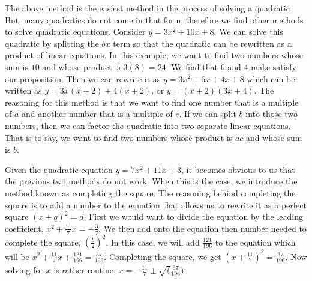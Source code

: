 \documentclass[12pt]{report}
\begin{document}
The above method is the easiest method in the process of solving a quadratic. But, many quadratics do not come in that form, therefore we find other methods to solve quadratic equations. Consider $y=3x^2+10x+8$. We can solve this quadratic by splitting the $bx$ term so that the quadratic can be rewritten as a product of linear equations. In this example, we want to find two numbers whose sum is $10$ and whose product is $3(8)=24$. We find that $6$ and $4$ make satisfy our proposition. Then we can rewrite it as $y=3x^2+6x+4x+8$ which can be written as $y=3x(x+2)+4(x+2)$, or $y=(x+2)(3x+4)$. The reasoning for this method is that we want to find one number that is a multiple of $a$ and another number that is a multiple of $c$. If we can split $b$ into those two numbers, then we can factor the quadratic into two separate linear equations. That is to say, we want to find two numbers whose product is $ac$ and whose sum is $b$.


Given the quadratic equation $y=7x^2+11x+3$, it becomes obvious to us that the previous two methods do not work. When this is the case, we introduce the method known as completing the square. The reasoning behind completing the square is to add a number to the equation that allows us to rewrite it as a perfect square $(x+q)^2=d$. First we would want to divide the equation by the leading coefficient, $x^2+ \frac{11}{7}x=-\frac{3}{7}$. We then add onto the equation then number needed to complete the square, $(\frac{b}{2})^2$. In this case, we will add $\frac{121}{196}$ to the equation which will be $x^2+\frac{11}{7}x+\frac{121}{196}=\frac{37}{196}$. Completing the square, we get $(x+\frac{11}{7})^2=\frac{37}{196}$. Now solving for $x$ is rather routine, $x=-\frac{11}{7} \pm \sqrt(\frac{37}{196})$.\medskip


\end{document}
